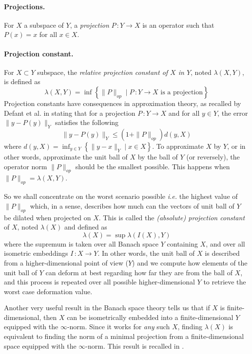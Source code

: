 \paragraph*{Projections.} For $X$ a subspace of $Y$, a \emph{projection} $P\,\colon Y\rightarrow X$ is an operator such that $P(x) = x$ for all $x\in X$.

\paragraph*{Projection constant.} For $X\subset Y$ subspace, the \emph{relative projection constant of $X$ in $Y$}, noted $\lambda(X,Y)$, is defined as
$$\lambda(X,Y) = \inf\left\{\|P\|_{op} \mid \text{$P\,\colon Y\rightarrow X$ is a projection} \right\}$$
Projection constants have consequences in approximation theory, as recalled by Defant et al. in \cite{defantProjectionConstantsSpaces2022} stating that for a projection $P\,\colon Y\rightarrow X$ and for all $y\in Y$, the error $\|y-P(y)\|_Y$ satisfies the following
$$\|y-P(y)\|_Y \leq (1 + \|P\|_{op})d(y,X)$$
where $d(y,X) = \inf_{y\in Y}\left\{\|y-x\|_Y \mid x\in X\right\}$. 
To approximate $X$ by $Y$, or in other words, approximate the unit ball of $X$ by the ball of $Y$ (or reversely), the operator norm $\|P\|_{op}$ should be the smallest possible. This happens when $\|P\|_{op} = \lambda(X,Y)$.

So we shall concentrate on the worst scenario possible \emph{i.e.} the highest value of $\|P\|_{op}$ which, in a sense, describes how much can the vectors of unit ball of $Y$ be dilated when projected on $X$. This is called the \emph{(absolute) projection constant} of $X$, noted $\lambda(X)$ and defined as 
$$\lambda(X) = \sup\lambda(I(X),Y)$$
where the supremum is taken over all Banach space $Y$ containing $X$, and over all isometric embeddings $I\,\colon X\rightarrow Y$. In other words, the unit ball of $X$ is described from a higher-dimensional point of view ($Y$) and we compute how elements of the unit ball of $Y$ can deform at best regarding how far they are from the ball of $X$, and this process is repeated over all possible higher-dimensional $Y$ to retrieve the worst case deformation value. 

Another very useful result in the Banach space theory tells us that if $X$ is finite-dimensional, then $X$ can be isometrically embedded into a finite-dimensional $Y$ equipped with the $\infty$-norm. Since it works for \emph{any} such $X$, finding $\lambda(X)$ is equivalent to finding the norm of a minimal projection from a finite-dimensional space equipped with the $\infty$-norm. This result is recalled in \cite{defantProjectionConstantsSpaces2022}.


